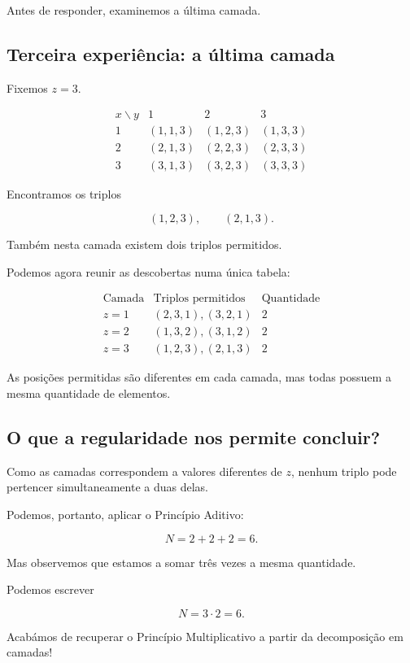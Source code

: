 \documentclass[11pt,a4paper,oneside]{book}
\begin{document}
Antes de responder, examinemos a última camada.

\subsection*{Terceira experiência: a última camada}

Fixemos $z=3$.

\[
\begin{array}{c|ccc}
x\backslash y & 1 & 2 & 3\\ \hline
1 &(1,1,3)&\boxed{(1,2,3)}&(1,3,3)\\[3pt]
2 &\boxed{(2,1,3)}&(2,2,3)&(2,3,3)\\[3pt]
3 &(3,1,3)&(3,2,3)&(3,3,3)
\end{array}
\]

Encontramos os triplos

\[
(1,2,3),\qquad(2,1,3).
\]

Também nesta camada existem dois triplos permitidos.

Podemos agora reunir as descobertas numa única tabela:

\[
\begin{array}{c|c|c}
\text{Camada}
&\text{Triplos permitidos}
&\text{Quantidade}\\ \hline
z=1 &(2,3,1),(3,2,1)&2\\
z=2 &(1,3,2),(3,1,2)&2\\
z=3 &(1,2,3),(2,1,3)&2
\end{array}
\]

As posições permitidas são diferentes em cada camada,
mas todas possuem a mesma quantidade de elementos.

\subsection*{O que a regularidade nos permite concluir?}

Como as camadas correspondem a valores diferentes de
$z$, nenhum triplo pode pertencer simultaneamente a
duas delas.

Podemos, portanto, aplicar o Princípio Aditivo:

\[
N=2+2+2=6.
\]

Mas observemos que estamos a somar três vezes a mesma
quantidade.

Podemos escrever

\[
N=3\cdot2=6.
\]

Acabámos de recuperar o Princípio Multiplicativo
a partir da decomposição em camadas!
\end{document}
